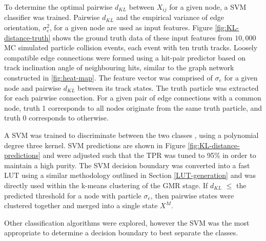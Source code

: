 To determine the optimal pairwise $d_{KL}$ between $X_{ij}$ for a given node, a SVM classifier was trained. Pairwise $d_{KL}$ and the empirical variance of edge orientation, $\sigma_{e}^{2}$, for a given node are used as input features. Figure \ref{fig:KL-distance-truth} shows the ground truth data of these input features from $10,000$ MC simulated particle collision events, each event with ten truth tracks. Loosely compatible edge connections were formed using a hit-pair predictor based on track inclination angle of neighbouring hits, similar to the graph network constructed in \ref{fig:heat-map}. The feature vector was comprised of $\sigma_{e}$ for a given node and pairwise $d_{KL}$ between its track states. The truth particle was extracted for each pairwise connection. For a given pair of edge connections with a common node, truth 1 corresponds to all nodes originate from the same truth particle, and truth 0 corresponds to otherwise. 


A SVM was trained to discriminate between the two classes \cite{scikit-learn}, using a polynomial degree three kernel. SVM predictions are shown in Figure \ref{fig:KL-distance-predictions} and were adjusted such that the TPR was tuned to 95\% in order to maintain a high purity. The SVM decision boundary was converted into a fast LUT using a similar methodology outlined in Section \ref{LUT-generation} and was directly used within the k-means clustering of the GMR stage. If $d_{KL}$ $\leq$ the predicted threshold for a node with particle $\sigma_e$, then pairwise states were clustered together and merged into a single state $X^M$.


Other classification algorithms were explored, however the SVM was the most appropriate to determine a decision boundary to best separate the classes.

